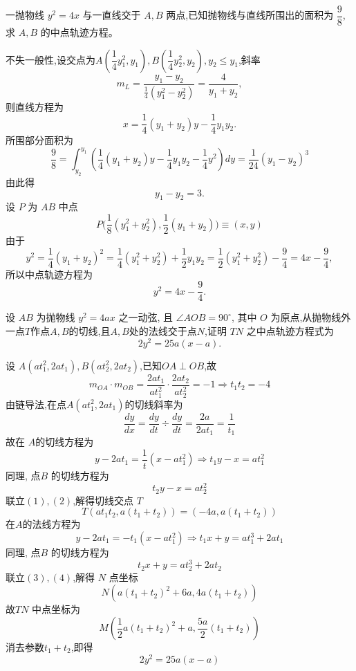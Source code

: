 \begin{questions}
    \question 一抛物线 $y^2 = 4x$ 与一直线交于 $A,B$ 两点,已知抛物线与直线所围出的面积为 $\dfrac{9}{8}$, 求 $A,B$ 的中点轨迹方程。
    \begin{solution}
        不失一般性,设交点为$A\left(\dfrac{1}{4}y_1^2, y_1\right), B\left(\dfrac{1}{4}y_2^2, y_2\right),y_2\le y_1$,斜率
        \[
        m_L = \frac{y_1 - y_2}{\frac{1}{4}(y_1^2 - y_2^2)} = \frac{4}{y_1 + y_2},
        \]
        则直线方程为
        \[
        x = \frac{1}{4}(y_1 + y_2)y - \frac{1}{4}y_1 y_2.
        \]
        所围部分面积为
        \[
        \frac{9}{8} = \int_{y_2}^{y_1} \left( \frac{1}{4}(y_1 + y_2)y - \frac{1}{4}y_1 y_2 - \frac{1}{4}y^2 \right) dy
        = \frac{1}{24} (y_1 - y_2)^3
        \]
        由此得
        \[
        y_1 - y_2 = 3.
        \]
        设 $P$ 为 $AB$ 中点
        \[
        P\Big(\frac{1}{8}(y_1^2 + y_2^2), \frac{1}{2}(y_1 + y_2)\Big) \equiv (x, y)
        \]
        由于
        \[
        y^2 = \frac{1}{4}(y_1 + y_2)^2 = \frac{1}{4}(y_1^2 + y_2^2) + \frac{1}{2}y_1 y_2
        = \frac{1}{2}(y_1^2 + y_2^2) - \frac{9}{4} = 4x - \frac{9}{4},
        \]
        所以中点轨迹方程为
        \[
        y^2 = 4x - \frac{9}{4}.
        \]
    \end{solution}

    \question 设 $AB$ 为抛物线 $y^2=4ax$ 之一动弦, 且 $\angle AOB = 90^\circ$, 其中 $O$ 为原点,从抛物线外一点$T$作点$A,B$的切线,且$A,B$处的法线交于点$N$,证明 $TN$ 之中点轨迹方程式为 
    \[
    2y^2 = 25a(x-a).
    \]
    \begin{solution}
        设 $A(at_1^2, 2at_1),B(at_2^2, 2at_2)$,已知$OA \perp OB$,故
        \[
        m_{OA}\cdot m_{OB}=\frac{2at_1}{at_1^2} \cdot \frac{2at_2}{at_2^2} = -1 \Rightarrow t_1 t_2 = -4
        \]
        由链导法,在点$A(at_1^2, 2at_1)$的切线斜率为
        \[
        \frac{dy}{dx}=\frac{dy}{dt} \div \frac{dy}{dt}=\frac{2a}{2at_1}=\frac{1}{t_1}
        \]
        故在 $A$的切线方程为
        \[
        y-2at_1=\frac{1}{t}(x-at_1^2) \Rightarrow t_1y - x = at_1^2 \tag{1}
        \]
        同理, 点$B$ 的切线方程为
        \[
        t_2y - x = at_2^2 \tag{2}
        \]
        联立$(1),(2)$,解得切线交点 $T$
        \[
        T(a t_1 t_2,a(t_1 + t_2))=(-4a,a(t_1 + t_2))
        \]
        在$A$的法线方程为
        \[
        y - 2at_1 = -t_1(x - at_1^2) \Rightarrow t_1 x + y = a t_1^3 + 2at_1 \tag{3}
        \]
        同理, 点$B$ 的切线方程为
        \[
        t_2 x + y = a t_2^3 + 2at_2 \tag{4}
        \]
        联立$(3),(4)$,解得 $N$ 点坐标
        \[
        N(a(t_1+t_2)^2 + 6a, 4a(t_1+t_2))
        \]
        故$TN$ 中点坐标为
        \[
        M\left(\frac{1}{2}a(t_1+t_2)^2 + a,\frac{5a}{2}(t_1+t_2)\right)
        \]
        消去参数$t_1+t_2$,即得
        \[
        2y^2 = 25a(x-a)
        \]
    \end{solution}


\end{questions}

